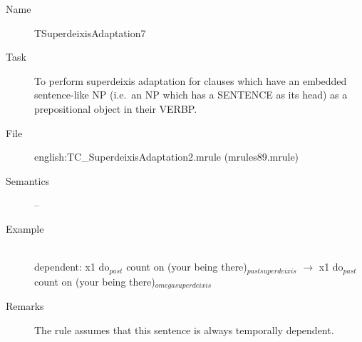 \begin{description}
\vspace{1 cm}
\begin{description}
\item[Name] TSuperdeixisAdaptation7
\item[Task] To perform superdeixis adaptation for clauses which have an 
embedded sentence-like NP (i.e.\ an NP which has a SENTENCE as its head) 
as a prepositional object in their VERBP. 
\item[File] english:TC\_SuperdeixisAdaptation2.mrule (mrules89.mrule)
\item[Semantics] --
\item[Example] \mbox{}\\
dependent: 
x1 do$_{past}$ count on (your being there)$_{pastsuperdeixis}$ $\rightarrow$
x1 do$_{past}$ count on (your being there)$_{omegasuperdeixis}$
\item[Remarks] 
The rule assumes that this sentence is always temporally dependent.
\end{description}


\end{description}
